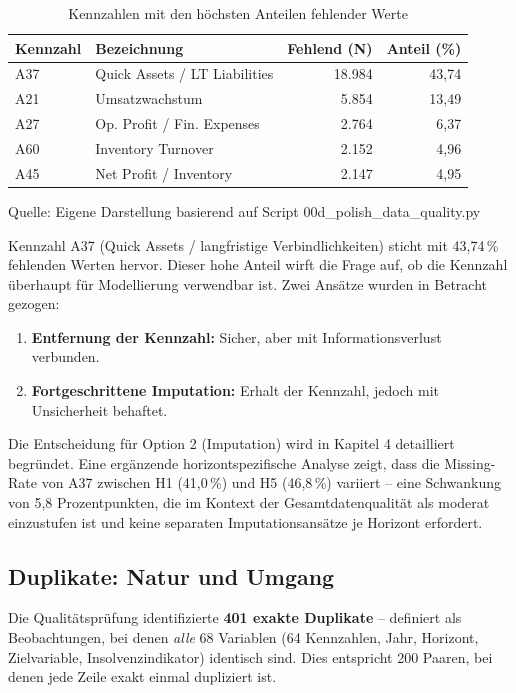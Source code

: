 \begin{table}[htbp]
\centering
\caption{Kennzahlen mit den höchsten Anteilen fehlender Werte}
\label{tab:missing_values}
\begin{tabular}{llrr}
\toprule
\textbf{Kennzahl} & \textbf{Bezeichnung} & \textbf{Fehlend (N)} & \textbf{Anteil (\%)} \\
\midrule
A37 & Quick Assets / LT Liabilities & 18.984 & 43,74 \\
A21 & Umsatzwachstum & 5.854 & 13,49 \\
A27 & Op. Profit / Fin. Expenses & 2.764 & 6,37 \\
A60 & Inventory Turnover & 2.152 & 4,96 \\
A45 & Net Profit / Inventory & 2.147 & 4,95 \\
\bottomrule
\end{tabular}
\par\smallskip
{\footnotesize Quelle: Eigene Darstellung basierend auf Script 00d\_polish\_data\_quality.py}
\end{table}

Kennzahl A37 (Quick Assets / langfristige Verbindlichkeiten) sticht mit 43,74\,\% fehlenden Werten hervor. Dieser hohe Anteil wirft die Frage auf, ob die Kennzahl überhaupt für Modellierung verwendbar ist. Zwei Ansätze wurden in Betracht gezogen:

\begin{enumerate}[topsep=0.2\baselineskip]
    \item \textbf{Entfernung der Kennzahl:} Sicher, aber mit Informationsverlust verbunden.
    \item \textbf{Fortgeschrittene Imputation:} Erhalt der Kennzahl, jedoch mit Unsicherheit behaftet.
\end{enumerate}

Die Entscheidung für Option 2 (Imputation) wird in Kapitel 4 detailliert begründet. Eine ergänzende horizontspezifische Analyse zeigt, dass die Missing-Rate von A37 zwischen H1 (41,0\,\%) und H5 (46,8\,\%) variiert – eine Schwankung von 5,8 Prozentpunkten, die im Kontext der Gesamtdatenqualität als moderat einzustufen ist und keine separaten Imputationsansätze je Horizont erfordert.

\subsection{Duplikate: Natur und Umgang}

Die Qualitätsprüfung identifizierte \textbf{401 exakte Duplikate} – definiert als Beobachtungen, bei denen \textit{alle} 68 Variablen (64 Kennzahlen, Jahr, Horizont, Zielvariable, Insolvenzindikator) identisch sind. Dies entspricht 200 Paaren, bei denen jede Zeile exakt einmal dupliziert ist.

